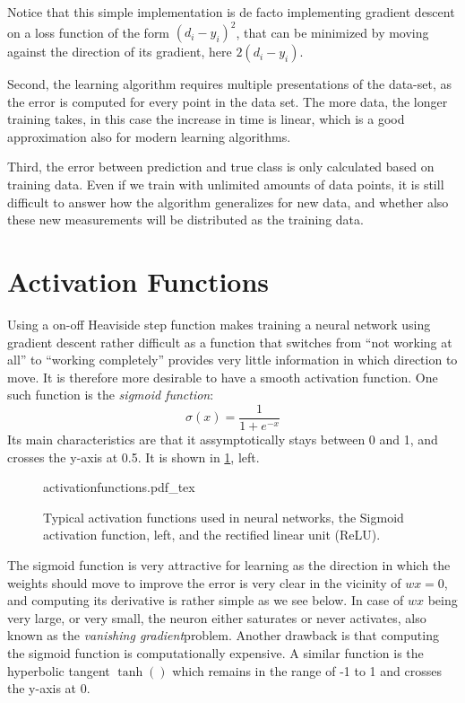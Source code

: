 Notice that this simple implementation is de facto implementing gradient descent on a loss function of the form $(d_i-y_i)^2$, that can be minimized by moving against the direction of its gradient, here $2(d_i-y_i)$.

Second, the learning algorithm requires multiple presentations of the data-set, as the error is computed for every point in the data set. The more data, the longer training takes, in this case the increase in time is linear, which is a good approximation also for modern learning algorithms.

Third, the error between prediction and true class is only calculated based on training data. Even if we train with unlimited amounts of data points, it is still difficult to answer how the algorithm generalizes for new data, and whether also these new measurements will be distributed as the training data.

\section{Activation Functions}
Using a on-off Heaviside step function makes training a neural network using gradient descent rather difficult as a function that switches from ``not working at all'' to ``working completely'' provides very little information in which direction to move. It is therefore more desirable to have a smooth activation function. One such function is the \textsl{sigmoid function}:
\begin{equation}
\sigma(x)=\frac{1}{1+e^{-x}}
\end{equation}
Its main characteristics are that it assymptotically stays between 0 and 1, and crosses the y-axis at 0.5. It is shown in \cref{fig:activationfunctions}, left.

\begin{figure}[htb]
    \centering
    \def\svgwidth{0.9\textwidth}
    {activationfunctions.pdf_tex}
    \caption{Typical activation functions used in neural networks, the Sigmoid activation function, left, and the rectified linear unit (ReLU).\label{fig:activationfunctions}}
\end{figure}

The sigmoid function is very attractive for learning as the direction in which the weights should move to improve the error is very clear in the vicinity of $wx=0$, and computing its derivative is rather simple as we see below. In case of $wx$ being very large, or very small, the neuron either saturates or never activates, also known as the \textsl{vanishing gradient}problem. Another drawback is that computing the sigmoid function is computationally expensive. A similar function is the hyperbolic tangent $\tanh()$ which remains in the range of -1 to 1 and crosses the y-axis at 0.

